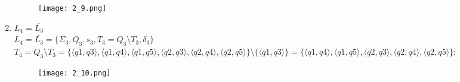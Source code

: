 \documentclass[12pt, a4paper]{article}
\begin{document}
\begin{enumerate}
\begin{comment}
digraph {
    rankdir="LR"
    "" [shape=point]
    q1q3 [shape=doublecircle]
    q2q3 [shape=circle]
    q1q4 [shape=circle]
    q2q4 [shape=circle]
    q1q5 [shape=circle]
    q2q5 [shape=circle]
    
    "" -> q1q3
    q1q3 -> q2q3 [label="a"]
    q1q3 -> q1q4 [label="b"]
    q1q4 -> q2q4 [label="a"]
    q1q4 -> q1q5 [label="b"]
    q1q5 -> q2q5 [label="a"]
    q1q5 -> q1q3 [label="b"]
    q2q3 -> q1q3 [label="a"]
    q2q3 -> q2q4 [label="b"]
    q2q4 -> q1q4 [label="a"]
    q2q4 -> q2q5 [label="b"]
    q2q5 -> q1q5 [label="a"]
    q2q5 -> q2q3 [label="b"]
}
\end{comment}

    \begin{figure}[H]
        \centering
        \texttt{[image: 2\_9.png]}
    \end{figure}
    \item \(L_4=\overline{L_3}\)
\\\(L_4=\overline{L_3}=\{\Sigma_3, Q_3, s_3, T_3=Q_3 \setminus T_3, \delta_3\} \)
\\\(T_4=Q_3 \setminus T_3= \{\langle q1,q3 \rangle, \langle q1,q4 \rangle, \langle q1,q5 \rangle, \langle q2,q3 \rangle, \langle q2,q4 \rangle, \langle q2,q5 \rangle \} \setminus \{\langle q1,q3 \rangle\} = \{\langle q1,q4 \rangle, \langle q1,q5 \rangle, \langle q2,q3 \rangle, \langle q2,q4 \rangle, \langle q2,q5 \rangle \}\):

\begin{comment}
digraph {
    rankdir="LR"
    "" [shape=point]
    q1q3 [shape=circle]
    q2q3 [shape=doublecircle]
    q1q4 [shape=doublecircle]
    q2q4 [shape=doublecircle]
    q1q5 [shape=doublecircle]
    q2q5 [shape=doublecircle]
    
    "" -> q1q3
    q1q3 -> q2q3 [label="a"]
    q1q3 -> q1q4 [label="b"]
    q1q4 -> q2q4 [label="a"]
    q1q4 -> q1q5 [label="b"]
    q1q5 -> q2q5 [label="a"]
    q1q5 -> q1q3 [label="b"]
    q2q3 -> q1q3 [label="a"]
    q2q3 -> q2q4 [label="b"]
    q2q4 -> q1q4 [label="a"]
    q2q4 -> q2q5 [label="b"]
    q2q5 -> q1q5 [label="a"]
    q2q5 -> q2q3 [label="b"]
}
\end{comment}

    \begin{figure}[H]
        \centering
        \texttt{[image: 2\_10.png]}
    \end{figure}
    

\end{enumerate}
\end{document}
